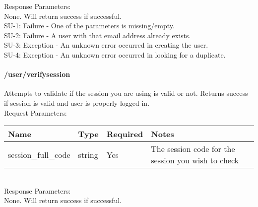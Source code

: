 \documentclass{article}[11pt]
\begin{document}
\noindent
Response Parameters: \\
None. Will return success if successful. \\

\ErrorsMysql
SU-1: Failure - One of the parameters is missing/empty. \\
SU-2: Failure - A user with that email address already exists. \\
SU-3: Exception - An unknown error occurred in creating the user. \\
SU-4: Exception - An unknown error occurred in looking for a duplicate.


\paragraph{/user/verifysession}\textbf{}

Attempts to validate if the session you are using is valid or not. Returns success if session is valid and user is properly logged in. \\

\noindent
Request Parameters:

\noindent
\begin{tabular}{|l|l|l|l|}
\hline
\textbf{Name} & \textbf{Type} & \textbf{Required} & \textbf{Notes} \\
\hline
session\_full\_code & string & Yes & The session code for the session you wish to check \\
\hline
\end{tabular} \\

\noindent
Response Parameters: \\
None. Will return success if successful. \\

\ErrorsSession
\end{document}
